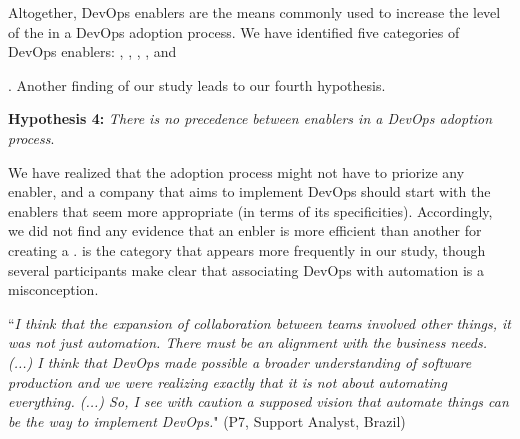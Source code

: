 Altogether, DevOps enablers are the means commonly used to increase the level of
the \cc in a DevOps adoption process.
We have identified five categories of DevOps enablers:
, , ,
, and {. Another finding of our
study leads to our fourth hypothesis.

\begin{mh}
\textbf{Hypothesis 4:} \textit{There is no precedence between enablers in a DevOps adoption process}.
\end{mh}

We have realized that the adoption process might not have
to priorize any enabler, and a company that aims to implement
DevOps should start with  the enablers that seem more appropriate (in terms
of its specificities). Accordingly, we did not find any evidence that an enbler
is more efficient than another for creating a \cc.  is the category
that appears more frequently in our study, though several participants make
clear that associating DevOps with automation is a misconception.

\begin{mq}
``\emph{I think that the expansion of collaboration between teams involved other
things, it was not just automation. There must be an alignment with the
business needs. (...) I think that DevOps made possible a broader understanding
of software production and we were realizing exactly that it is not about
automating everything. (...) So, I see with caution a supposed vision that automate things can
be the way to implement DevOps.}" (P7, Support Analyst, Brazil)
\end{mq}



}
